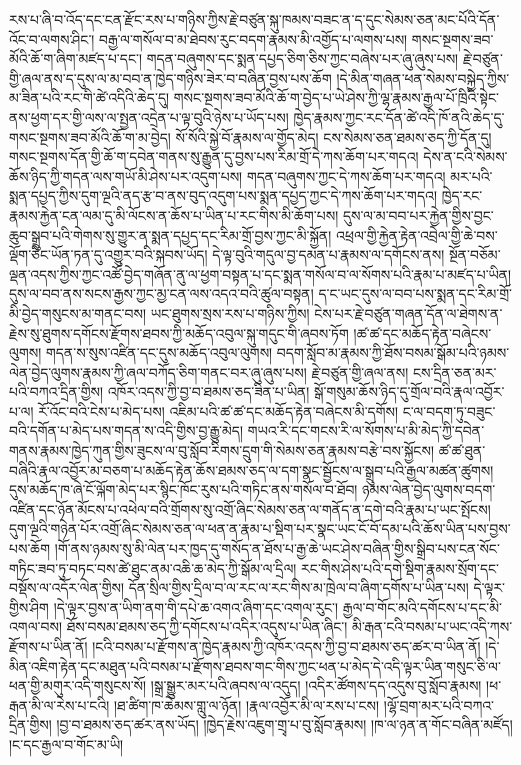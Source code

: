 \documentclass{article}
\begin{document}
རས་པ་ཞི་བ་འོད་དང་ངན་རྫོང་རས་པ་གཉིས་ཀྱིས་རྗེ་བཙུན་སྐུ་ཁམས་བཟང་ན་ད་དུང་སེམས་ཅན་མང་པོའི་དོན་འོང་བ་ལགས་ཤིང་། བརྒྱ་ལ་གསོལ་བ་མ་ཐེབས་རུང་བདག་རྣམས་མི་འགྱོད་པ་ལགས་པས། གསང་སྔགས་ཟབ་མོའི་ཆོ་ག་ཞིག་མཛད་པ་དང་། གདན་བཞུགས་དང་སྨན་དཔྱད་ཅིག་ཅིས་ཀྱང་བཞེས་པར་ཞུ་ཞུས་པས། རྗེ་བཙུན་གྱི་ཞལ་ནས་ད་དུས་ལ་མ་བབ་ན་ཁྱེད་གཉིས་ཟེར་བ་བཞིན་བྱས་པས་ཆོག །དེ་མིན་གཞན་ཕན་སེམས་བསྐྱེད་ཀྱིས་མ་ཟིན་པའི་རང་གི་ཚེ་འདིའི་ཆེད་དུ། གསང་སྔགས་ཟབ་མོའི་ཆོ་ག་བྱེད་པ་ཡེ་ཤེས་ཀྱི་ལྷ་རྣམས་རྒྱལ་པོ་ཁྲིའི་སྟེང་ནས་ཕྱག་དར་གྱི་ལས་ལ་སྤྱན་འདྲེན་པ་ལྟ་བུའི་ཉེས་པ་ཡོད་པས། ཁྱེད་རྣམས་ཀྱང་རང་དོན་ཚེ་འདི་ཁོ་ནའི་ཆེད་དུ་གསང་སྔགས་ཟབ་མོའི་ཆོ་ག་མ་བྱེད། སོ་སོའི་སྐྱེ་བོ་རྣམས་ལ་གྱོད་མེད། ངས་སེམས་ཅན་ཐམས་ཅད་ཀྱི་དོན་དུ། གསང་སྔགས་དོན་གྱི་ཆོ་ག་དབེན་གནས་སུ་རྒྱུན་དུ་བྱས་པས་རིམ་གྲོ་དེ་ཀས་ཆོག་པར་གདའ། དེས་ན་ངའི་སེམས་ཆོས་ཉིད་ཀྱི་གདན་ལས་གཡོ་མི་ཤེས་པར་འདུག་པས། གདན་བཞུགས་ཀྱང་དེ་ཀས་ཆོག་པར་གདའ། མར་པའི་སྨན་དཔྱད་ཀྱིས་དུག་ལྔའི་ནད་རྩ་བ་ནས་བུད་འདུག་པས་སྨན་དཔྱད་ཀྱང་དེ་ཀས་ཆོག་པར་གདའ། ཁྱེད་རང་རྣམས་རྐྱེན་ངན་ལམ་དུ་མི་ལོངས་ན་ཆོས་པ་ཡིན་པ་རང་གིས་མི་ཆོག་པས། དུས་ལ་མ་བབ་པར་རྐྱེན་གྱིས་བྱང་ཆུབ་སྒྲུབ་པའི་གེགས་སུ་གྱུར་ན་སྨན་དཔྱད་དང་རིམ་གྲོ་བྱས་ཀྱང་མི་སྐྱོན། འཕྲལ་གྱི་རྐྱེན་རྟེན་འབྲེལ་གྱི་ཆེ་བས་ལྡོག་ཅིང་ཡོན་ཏན་དུ་འགྱུར་བའི་སྐབས་ཡོད། དེ་ལྟ་བུའི་གདུལ་བྱ་དམན་པ་རྣམས་ལ་དགོངས་ནས། སྔོན་བཅོམ་ལྡན་འདས་ཀྱིས་ཀྱང་འཚོ་བྱེད་གཞོན་ནུ་ལ་ཕྱག་བསྟན་པ་དང་སྨན་གསོལ་བ་ལ་སོགས་པའི་རྣམ་པ་མཛད་པ་ཡིན། དུས་ལ་བབ་ནས་སངས་རྒྱས་ཀྱང་མྱ་ངན་ལས་འདའ་བའི་ཚུལ་བསྟན། ད་ང་ཡང་དུས་ལ་བབ་པས་སྨན་དང་རིམ་གྲོ་མི་བྱེད་གསུངས་མ་གནང་བས། ཡང་ཐུགས་སྲས་རས་པ་གཉིས་ཀྱིས། ངེས་པར་རྗེ་བཙུན་གཞན་དོན་ལ་ཐེགས་ན་རྗེས་སུ་ཐུགས་དགོངས་རྫོགས་ཐབས་ཀྱི་མཆོད་འབུལ་སྐུ་གདུང་གི་ཞབས་ཏོག །ཚ་ཚ་དང་མཆོད་རྟེན་བཞེངས་ལུགས། གདན་ས་སུས་འཛིན་དང་དུས་མཆོད་འབུལ་ལུགས། བདག་སློབ་མ་རྣམས་ཀྱི་ཐོས་བསམ་སྒོམ་པའི་ཉམས་ལེན་བྱེད་ལུགས་རྣམས་ཀྱི་ཞལ་བཀོད་ཅིག་གནང་བར་ཞུ་ཞུས་པས། རྗེ་བཙུན་གྱི་ཞལ་ནས། ངས་དྲིན་ཅན་མར་པའི་བཀའ་དྲིན་གྱིས། འཁོར་འདས་ཀྱི་བྱ་བ་ཐམས་ཅད་ཟིན་པ་ཡིན། སྒོ་གསུམ་ཆོས་ཉིད་དུ་གྲོལ་བའི་རྣལ་འབྱོར་པ་ལ། རོ་འོང་བའི་ངེས་པ་མེད་པས། འཇིམ་པའི་ཚ་ཚ་དང་མཆོད་རྟེན་བཞེངས་མི་དགོས། ང་ལ་བདག་ཏུ་བཟུང་བའི་དགོན་པ་མེད་པས་གདན་ས་འདི་གྱིས་བྱ་རྒྱུ་མེད། གཡའ་རི་དང་གངས་རི་ལ་སོགས་པ་མི་མེད་ཀྱི་དབེན་གནས་རྣམས་ཁྱེད་ཀུན་གྱིས་ཟུངས་ལ་བུ་སློབ་རིགས་དྲུག་གི་སེམས་ཅན་རྣམས་བརྩེ་བས་སྐྱོངས། ཚ་ཚ་ཐུན་བཞིའི་རྣལ་འབྱོར་མ་བཅག་པ་མཆོད་རྟེན་ཆོས་ཐམས་ཅད་ལ་དག་སྣང་སྦྱོངས་ལ་སྒྲུབ་པའི་རྒྱལ་མཚན་ཚུགས། དུས་མཆོད་ཁ་ཞེ་ངོ་ལྐོག་མེད་པར་སྙིང་ཁོང་རུས་པའི་གཏིང་ནས་གསོལ་བ་ཐོབ། ཉམས་ལེན་བྱེད་ལུགས་བདག་འཛིན་དང་ཉོན་མོངས་པ་འཕེལ་བའི་གྲོགས་སུ་འགྲོ་ཞིང་སེམས་ཅན་ལ་གནོད་ན་དགེ་བའི་རྣམ་པ་ཡང་སྤོངས། དུག་ལྔའི་གཉེན་པོར་འགྲོ་ཞིང་སེམས་ཅན་ལ་ཕན་ན་རྣམ་པ་སྡིག་པར་སྣང་ཡང་ངོ་བོ་དམ་པའི་ཆོས་ཡིན་པས་བྱས་པས་ཆོག །གོ་ནས་ཉམས་སུ་མི་ལེན་པར་ཁྱད་དུ་གསོད་ན་ཐོས་པ་རྒྱ་ཆེ་ཡང་ཤེས་བཞིན་གྱིས་སྒྲིབ་པས་ངན་སོང་གཏིང་ཟབ་ཏུ་བཏང་བས་ཚེ་ཐུང་ནམ་འཆི་ཆ་མེད་ཀྱི་སྒོམ་ལ་དྲིལ། རང་གིས་ཤེས་པའི་དགེ་སྡིག་རྣམས་སྲོག་དང་བསྡོས་ལ་འདོར་ལེན་གྱིས། དོན་སྲིལ་གྱིས་དྲིལ་བ་ལ་རང་ལ་རང་གིས་མ་ཁྲེལ་བ་ཞིག་དགོས་པ་ཡིན་པས། དེ་ལྟར་གྱིས་ཤིག །དེ་ལྟར་བྱས་ན་ཡིག་ནག་གི་དཔེ་ཆ་འགའ་ཞིག་དང་འགལ་རུང་། རྒྱལ་བ་གོང་མའི་དགོངས་པ་དང་མི་འགལ་བས། ཐོས་བསམ་ཐམས་ཅད་ཀྱི་དགོངས་པ་འདིར་འདུས་པ་ཡིན་ཞིང་། མི་རྒན་ངའི་བསམ་པ་ཡང་འདི་ཀས་རྫོགས་པ་ཡིན་ནོ། །ངའི་བསམ་པ་རྫོགས་ན་ཁྱེད་རྣམས་ཀྱི་འཁོར་འདས་ཀྱི་བྱ་བ་ཐམས་ཅད་ཚར་བ་ཡིན་ནོ། །དེ་མིན་འཇིག་རྟེན་དང་མཐུན་པའི་བསམ་པ་རྫོགས་ཐབས་གང་གིས་ཀྱང་ཕན་པ་མེད་དེ་འདི་ལྟར་ཡིན་གསུང་ཅི་ལ་ཕན་གྱི་མགུར་འདི་གསུངས་སོ། །སྒྲ་སྒྱུར་མར་པའི་ཞབས་ལ་འདུད། །འདིར་ཚོགས་དད་འདུས་བུ་སློབ་རྣམས། །ཕ་རྒན་མི་ལ་རེས་པ་ངའི། །ཐ་ཚིག་ཁ་ཆེམས་གླུ་ལ་ཉོན། །རྣལ་འབྱོར་མི་ལ་རས་པ་ངས། །ལྷོ་བྲག་མར་པའི་བཀའ་དྲིན་གྱིས། །བྱ་བ་ཐམས་ཅད་ཚར་ནས་ཡོད། །ཁྱེད་རྗེས་འཇུག་གྲྭ་པ་བུ་སློབ་རྣམས། །ཁ་ལ་ཉན་ན་གོང་བཞིན་མཛོད། །ང་དང་རྒྱལ་བ་གོང་མ་ཡི། 
\end{document}
